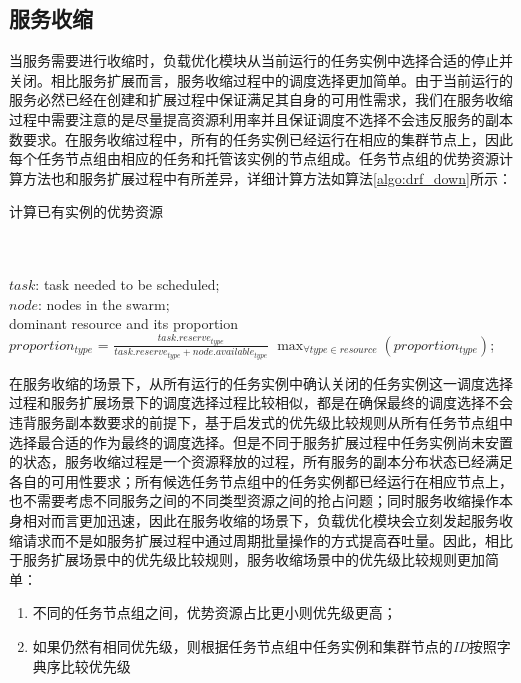 \subsection{服务收缩}\label{sec:scalein}
当服务需要进行收缩时，负载优化模块从当前运行的任务实例中选择合适的停止并关闭。相比服务扩展而言，服务收缩过程中的调度选择更加简单。由于当前运行的服务必然已经在创建和扩展过程中保证满足其自身的可用性需求，我们在服务收缩过程中需要注意的是尽量提高资源利用率并且保证调度不选择不会违反服务的副本数要求。在服务收缩过程中，所有的任务实例已经运行在相应的集群节点上，因此每个任务节点组由相应的任务和托管该实例的节点组成。任务节点组的优势资源计算方法也和服务扩展过程中有所差异，详细计算方法如算法\ref{algo:drf_down}所示：
\begin{algorithm}[H]
\caption{计算已有实例的优势资源}
\label{algo:drf_down}
\begin{algorithmic}[0]
\\
\Require ~~\
\\
$task$: task needed to be scheduled;\\
$node$: nodes in the swarm;
\Ensure ~~\
\\
dominant resource and its proportion\\

        \State $proportion_{type}$ = $\frac{task.reserve_{type}}{task.reserve_{type}+node.available_{type}}$
    \EndFor
    \State \Return $\max_{\forall type \in resource} {(proportion_{type})}$;
\EndFunction
\end{algorithmic}
\end{algorithm}

在服务收缩的场景下，从所有运行的任务实例中确认关闭的任务实例这一调度选择过程和服务扩展场景下的调度选择过程比较相似，都是在确保最终的调度选择不会违背服务副本数要求的前提下，基于启发式的优先级比较规则从所有任务节点组中选择最合适的作为最终的调度选择。但是不同于服务扩展过程中任务实例尚未安置的状态，服务收缩过程是一个资源释放的过程，所有服务的副本分布状态已经满足各自的可用性要求；所有候选任务节点组中的任务实例都已经运行在相应节点上，也不需要考虑不同服务之间的不同类型资源之间的抢占问题；同时服务收缩操作本身相对而言更加迅速，因此在服务收缩的场景下，负载优化模块会立刻发起服务收缩请求而不是如服务扩展过程中通过周期批量操作的方式提高吞吐量。因此，相比于服务扩展场景中的优先级比较规则，服务收缩场景中的优先级比较规则更加简单：
\begin{enumerate}
\item 不同的任务节点组之间，优势资源占比更小则优先级更高；
\item 如果仍然有相同优先级，则根据任务节点组中任务实例和集群节点的\emph{ID}按照字典序比较优先级
\end{enumerate}

